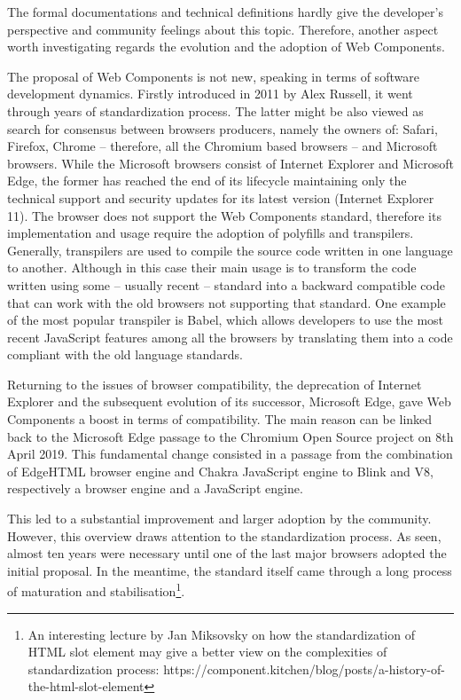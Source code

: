 The formal documentations and technical definitions hardly give the developer’s perspective and community feelings about this topic. Therefore, another aspect worth investigating regards the evolution and the adoption of Web Components.

The proposal of Web Components is not new, speaking in terms of software development dynamics. Firstly introduced in 2011 by Alex Russell, it went through years of standardization process. The latter might be also viewed as search for consensus between browsers producers, namely the owners of: Safari, Firefox, Chrome – therefore, all the Chromium based browsers – and Microsoft browsers. While the Microsoft browsers consist of Internet Explorer and Microsoft Edge, the former has reached the end of its lifecycle maintaining only the technical support and security updates for its latest version (Internet Explorer 11). The browser does not support the Web Components standard, therefore its implementation and usage require the adoption of polyfills and transpilers.
Generally, transpilers are used to compile the source code written in one language to another. Although in this case their main usage is to transform the code written using some – usually recent – standard into a backward compatible code that can work with the old browsers not supporting that standard. One example of the most popular transpiler is Babel, which allows developers to use the most recent JavaScript features among all the browsers by translating them into a code compliant with the old language standards.


Returning to the issues of browser compatibility, the deprecation of Internet Explorer and the subsequent evolution of its successor, Microsoft Edge, gave Web Components a boost in terms of compatibility. The main reason can be linked back to the Microsoft Edge passage to the Chromium Open Source project on 8th April 2019. This fundamental change consisted in a passage from the combination of EdgeHTML browser engine and Chakra JavaScript engine to Blink and V8, respectively a browser engine and a JavaScript engine.

This led to a substantial improvement and larger adoption by the community. However, this overview draws attention to the standardization process. As seen, almost ten years were necessary until one of the last major browsers adopted the initial proposal. In the meantime, the standard itself came through a long process of maturation and stabilisation\footnote{An interesting lecture by Jan Miksovsky on how the standardization of HTML slot element may give a better view on the complexities of standardization process: https://component.kitchen/blog/posts/a-history-of-the-html-slot-element}.

